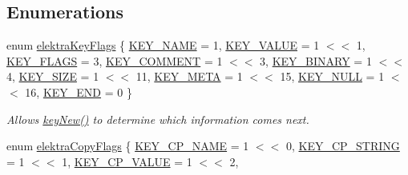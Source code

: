 \subsection*{Enumerations}
\begin{DoxyCompactItemize}
\item 
enum \hyperlink{group__key_ga9b703ca49f48b482def322b77d3e6bc8}{elektra\+Key\+Flags} \{ \newline
\hyperlink{group__key_gga9b703ca49f48b482def322b77d3e6bc8ad6127fc38f96410bf7c8f6e93b0397da}{K\+E\+Y\+\_\+\+N\+A\+ME} = 1, 
\hyperlink{group__key_gga9b703ca49f48b482def322b77d3e6bc8ac66e4a49d09212b79f5754ca6db5bd2e}{K\+E\+Y\+\_\+\+V\+A\+L\+UE} = 1 $<$$<$ 1, 
\hyperlink{group__key_gga9b703ca49f48b482def322b77d3e6bc8a4b83f86a07a7a0d6e24ecafe43cfea1b}{K\+E\+Y\+\_\+\+F\+L\+A\+GS} = 3, 
\hyperlink{group__key_gga9b703ca49f48b482def322b77d3e6bc8ac29427bb47cc31689d02912e36161ee3}{K\+E\+Y\+\_\+\+C\+O\+M\+M\+E\+NT} = 1 $<$$<$ 3, 
\newline
\hyperlink{group__key_gga9b703ca49f48b482def322b77d3e6bc8a1ca18d4e094ae7487d35ecedda2235ff}{K\+E\+Y\+\_\+\+B\+I\+N\+A\+RY} = 1 $<$$<$ 4, 
\hyperlink{group__key_gga9b703ca49f48b482def322b77d3e6bc8a6d531b5c41445d19d0452eebdccbfa01}{K\+E\+Y\+\_\+\+S\+I\+ZE} = 1 $<$$<$ 11, 
\hyperlink{group__key_gga9b703ca49f48b482def322b77d3e6bc8a040582834bb2d90049947d7ef74e87e2}{K\+E\+Y\+\_\+\+M\+E\+TA} = 1 $<$$<$ 15, 
\hyperlink{group__key_gga9b703ca49f48b482def322b77d3e6bc8ab089c5e7977d6e58737eb586ee153b7f}{K\+E\+Y\+\_\+\+N\+U\+LL} = 1 $<$$<$ 16, 
\newline
\hyperlink{group__key_gga9b703ca49f48b482def322b77d3e6bc8aa8adb6fcb92dec58fb19410eacfdd403}{K\+E\+Y\+\_\+\+E\+ND} = 0
 \}\begin{DoxyCompactList}\small\item\em Allows \hyperlink{group__key_gad23c65b44bf48d773759e1f9a4d43b89}{key\+New()} to determine which information comes next. \end{DoxyCompactList}
\item 
enum \hyperlink{group__key_ga9ff42b1e9a97222562bfda3dd1f8c735}{elektra\+Copy\+Flags} \{ \newline
\hyperlink{group__key_gga9ff42b1e9a97222562bfda3dd1f8c735ab41d70eb97ae5480333e85759318b5a9}{K\+E\+Y\+\_\+\+C\+P\+\_\+\+N\+A\+ME} = 1 $<$$<$ 0, 
\hyperlink{group__key_gga9ff42b1e9a97222562bfda3dd1f8c735a57996652569a901d4e7e58c33f7b3631}{K\+E\+Y\+\_\+\+C\+P\+\_\+\+S\+T\+R\+I\+NG} = 1 $<$$<$ 1, 
\hyperlink{group__key_gga9ff42b1e9a97222562bfda3dd1f8c735a3043a92bfbe465ccff7624e54d89bcf8}{K\+E\+Y\+\_\+\+C\+P\+\_\+\+V\+A\+L\+UE} = 1 $<$$<$ 2, 
$$
\end{DoxyCompactItemize}
